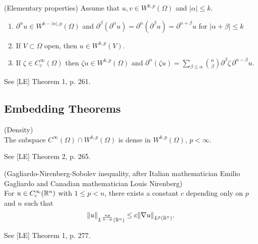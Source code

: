 \documentclass[11pt]{article}
\begin{document}
		\begin{prop}
			(Elementary properties) Assume that $u,v\in W^{k,p}(\Omega)$ and $|\alpha|\le k$.
			\begin{enumerate}
				\item $\partial^\alpha u\in W^{k-|\alpha|,p}(\Omega)$ and $\partial^\beta(\partial^\alpha u)=\partial^\alpha(\partial^\beta u)=\partial^{\alpha+\beta}u$ for $|\alpha+\beta|\le k$
				\item If $V\subset\Omega$ open, then $u\in W^{k,p}(V)$.
				\item If $\zeta\in C^\infty_c(\Omega)$ then $\zeta u\in W^{k,p}(\Omega)$ and $\partial^\alpha(\zeta u)=\sum_{\beta\le\alpha}\binom{\alpha}{\beta}\partial^\beta\zeta\,\partial^{\alpha-\beta}u$.
			\end{enumerate}
		\end{prop}
		\begin{pproof}
			See [LE] Theorem 1, p. 261.
		\end{pproof}


    	\subsection{Embedding Theorems}
    
    
    		\begin{thm}
    			(Density)\\ The subspace $C^\infty(\Omega)\cap W^{k,p}(\Omega)$ is dense in $W^{k,p}(\Omega)$, $p<\infty$.
    		\end{thm}
    		\begin{pproof}
    			See [LE] Theorem 2, p. 265.
    		\end{pproof}
    
    		\begin{thm}\label{thm--Nirenberg}
    			(Gagliardo-Nirenberg-Sobolev inequality, after Italian mathematician Emilio Gagliardo and Canadian mathematician Louis Nirenberg)\\
    			For $u\in C^\infty_c(\mathbb{R}^n)$ with $1\le p<n$, there exists a constant $c$ depending only on $p$ and $n$ such that 
    			\begin{equation*}
    				\norm{u}_{L^{\frac{np}{n-p}}(\mathbb{R}^n)}\le c\norm{\nabla u}_{L^p(\mathbb{R}^n)}.
    			\end{equation*}
    		\end{thm}
    		\begin{pproof}
    			See [LE] Theorem 1, p. 277.
    		\end{pproof}
    
\end{document}
